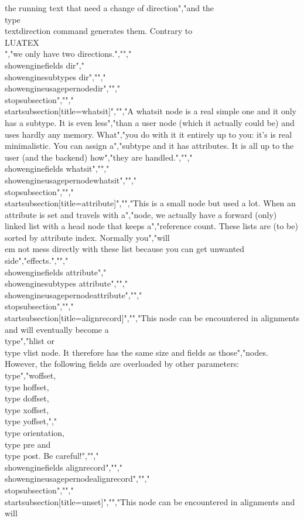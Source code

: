 the running text that need a change of direction","and the \\type {\\textdirection} command generates them. Contrary to \\LUATEX\\","we only have two directions.","","\\showenginefields   {dir}","\\showenginesubtypes {dir}","","\\showengineusagepernode{dir}","","\\stopsubsection","","\\startsubsection[title={whatsit}]","","A whatsit node is a real simple one and it only has a subtype. It is even less","than a user node (which it actually could be) and uses hardly any memory. What","you do with it it entirely up to you: it's is real minimalistic. You can assign a","subtype and it has attributes. It is all up to the user (and the backend) how","they are handled.","","\\showenginefields {whatsit}","","\\showengineusagepernode{whatsit}","","\\stopsubsection","","\\startsubsection[title={attribute}]","","This is a small node but used a lot. When an attribute is set and travels with a","node, we actually have a forward (only) linked list with a head node that keeps a","reference count. These lists are (to be) sorted by attribute index. Normally you","will {\\em not} mess directly with these list because you can get unwanted side","effects.","","\\showenginefields   {attribute}","\\showenginesubtypes {attribute}","","\\showengineusagepernode{attribute}","","\\stopsubsection","","\\startsubsection[title={alignrecord}]","","This node can be encountered in alignments and will eventually become a \\type","{hlist} or \\type {vlist} node. It therefore has the same size and fields as those","nodes. However, the following fields are overloaded by other parameters: \\type","{woffset}, \\type {hoffset}, \\type {doffset}, \\type {xoffset}, \\type {yoffset},","\\type {orientation}, \\type {pre} and \\type {post}. Be careful!","","\\showenginefields {alignrecord}","","\\showengineusagepernode{alignrecord}","","\\stopsubsection","","\\startsubsection[title={unset}]","","This node can be encountered in alignments and will 